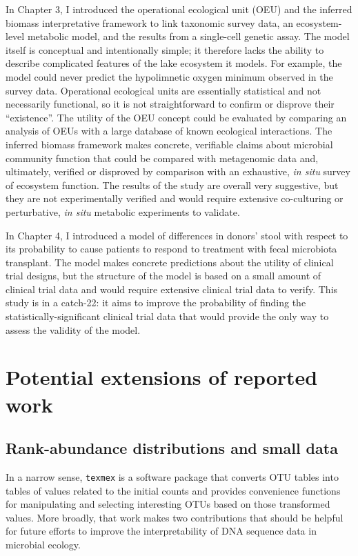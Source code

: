 In Chapter 3, I introduced the operational ecological unit (OEU) and
the inferred biomass interpretative framework to link taxonomic survey data, an
ecosystem-level metabolic model, and the results from a single-cell genetic
assay. The model itself is conceptual and intentionally simple; it therefore
lacks the ability to describe complicated features of the lake
ecosystem it models. For example, the model could never predict the
hypolimnetic oxygen minimum observed in the survey data. Operational
ecological units are essentially statistical and not necessarily functional,
so it is not straightforward to confirm or disprove their ``existence''. The
utility of the OEU concept could be evaluated by comparing an analysis of OEUs
with a large database of known ecological interactions. The inferred biomass
framework makes concrete, verifiable claims about microbial community function
that could be compared with metagenomic data and, ultimately, verified or
disproved by comparison with an exhaustive, \textit{in situ} survey of
ecosystem function. The results of the study are overall very suggestive, but
they are not experimentally verified and would require extensive co-culturing
or perturbative, \textit{in situ} metabolic experiments to validate.

In Chapter 4, I introduced a model of differences in donors' stool with
respect to its probability to cause patients to respond to treatment with fecal microbiota
transplant. The model makes concrete predictions about the utility of clinical
trial designs, but the structure of the model is based on a small amount of
clinical trial data and would require extensive clinical trial data to verify.
This study is in a catch-22: it aims to improve the probability of finding the
statistically-significant clinical trial data that would provide the only way to
assess the validity of the model.

\section{Potential extensions of reported work}
\subsection{Rank-abundance distributions and small data}
In a narrow sense, \texttt{texmex} is a software package that converts OTU tables
into tables of values related to the initial counts and provides convenience
functions for manipulating and selecting interesting OTUs based on those
transformed values. More broadly, that work makes two contributions that should
be helpful for future efforts to improve the interpretability of DNA sequence
data in microbial ecology.

